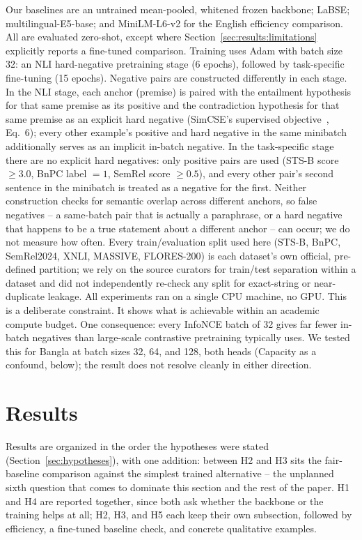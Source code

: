 \documentclass[manuscript]{acmart}
\begin{document}
Our baselines are an untrained mean-pooled, whitened frozen backbone; LaBSE; multilingual-E5-base; and MiniLM-L6-v2 for the English efficiency comparison. All are evaluated zero-shot, except where Section~\ref{sec:results:limitations} explicitly reports a fine-tuned comparison. Training uses Adam with batch size 32: an NLI hard-negative pretraining stage (6 epochs), followed by task-specific fine-tuning (15 epochs). Negative pairs are constructed differently in each stage. In the NLI stage, each anchor (premise) is paired with the entailment hypothesis for that same premise as its positive and the contradiction hypothesis for that same premise as an explicit hard negative (SimCSE's supervised objective~\citep{gao2021simcse}, Eq.~6); every other example's positive and hard negative in the same minibatch additionally serves as an implicit in-batch negative. In the task-specific stage there are no explicit hard negatives: only positive pairs are used (STS-B score $\geq 3.0$, BnPC label $=1$, SemRel score $\geq 0.5$), and every other pair's second sentence in the minibatch is treated as a negative for the first. Neither construction checks for semantic overlap across different anchors, so false negatives -- a same-batch pair that is actually a paraphrase, or a hard negative that happens to be a true statement about a different anchor -- can occur; we do not measure how often. Every train/evaluation split used here (STS-B, BnPC, SemRel2024, XNLI, MASSIVE, FLORES-200) is each dataset's own official, pre-defined partition; we rely on the source curators for train/test separation within a dataset and did not independently re-check any split for exact-string or near-duplicate leakage. All experiments ran on a single CPU machine, no GPU. This is a deliberate constraint. It shows what is achievable within an academic compute budget. One consequence: every InfoNCE batch of 32 gives far fewer in-batch negatives than large-scale contrastive pretraining typically uses. We tested this for Bangla at batch sizes 32, 64, and 128, both heads (Capacity as a confound, below); the result does not resolve cleanly in either direction.

\section{Results}
\label{sec:results}

Results are organized in the order the hypotheses were stated (Section~\ref{sec:hypotheses}), with one addition: between H2 and H3 sits the fair-baseline comparison against the simplest trained alternative -- the unplanned sixth question that comes to dominate this section and the rest of the paper. H1 and H4 are reported together, since both ask whether the backbone or the training helps at all; H2, H3, and H5 each keep their own subsection, followed by efficiency, a fine-tuned baseline check, and concrete qualitative examples.
\end{document}
